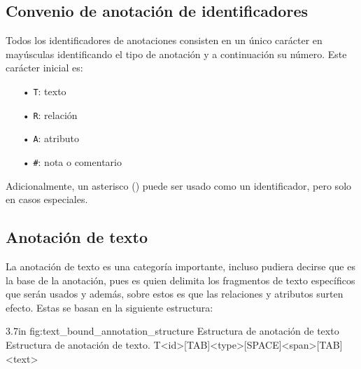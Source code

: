 \subsection{Convenio de anotación de identificadores}
\label{subsection:id_annotation_conventions}
Todos los identificadores de anotaciones consisten en un único carácter en mayúsculas identificando el tipo de anotación y a continuación su número. Este carácter inicial es:

\vspace{-0.1in}
\begin{center}
	\begin{itemize}
		\item[•] \texttt{T}: texto
		\vspace{-0.1in}
		\item[•] \texttt{R}: relación
		\vspace{-0.1in}
		\item[•] \texttt{A}: atributo
		\vspace{-0.1in}
		\item[•] \texttt{\#}: nota o comentario
	\end{itemize}
\end{center}

\vspace{-0.1in}
Adicionalmente, un asterisco (\doublequote{\,*\,}) puede ser usado como un identificador, pero solo en casos especiales.

\subsection{Anotación de texto}
La anotación de texto es una categoría importante, incluso pudiera decirse que es la base de la anotación, pues es quien delimita los fragmentos de texto específicos que serán usados y además, sobre estos es que las relaciones y atributos surten efecto. Estas se basan en la siguiente estructura:

\begin{annexample}
	[backgroundcolor=green!13]
	{3.7in}
	{fig:text_bound_annotation_structure}
	{Estructura de anotación de texto}
	{Estructura de anotación de texto.}
	T<id>[TAB]<type>[SPACE]<span>[TAB]<text>
\end{annexample}

